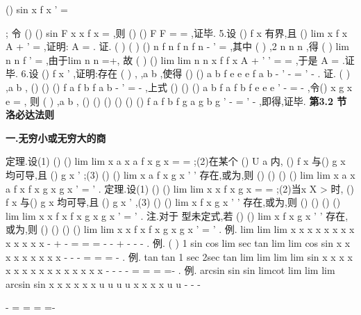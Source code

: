 ()
sin
x f x
'
\Leftrightarrow 
\cdots 
=




; 
令
()
()
sin
F x
x f x
=
\cdots 
,则
()
()
F
F \pi 
=
=
,证毕. 
5.设
()
f x 有界,且
()
lim
x
f
x
A
\to +\infty 
'
=
,证明:
A =
. 
证.
(
)
(
)
()
n
f
n
f n
f
n
\psi 
-
'
=
,其中
(
)
,2
n
n
n
\psi \in 
,得
(
)
lim
n
n
f
\psi 
\to \infty 
'
=
,由于lim
n
n
\psi 
\to \infty 
=+\infty , 
故
(
)
()
lim
lim
n
n
x
f
f
x
A
\psi 
\to \infty 
\to +\infty 
'
'
=
=
,于是
A =
.证毕. 
6.设
()
f
x
'
\neq 
,证明:存在
(
)
,
,a b
\psi \eta \in 
,使得
()
()
a
b
f
e
e e
f
a
b
\eta 
\psi 
\eta 
-
'
-
=
'
-
. 
证.
(
)
,a b
\psi 
\exists \in 
,
()
()
()
f a
f b
f
a
b
\psi 
-
'
=
-
,上式
()
()
()
a
b
f a
f b
f
e
e
e\eta 
\eta 
'
-
\Leftrightarrow 
=
-
,令()
x
g x
e
=
, 
则
(
)
,a b
\eta 
\exists 
\in 
,
()
()
()
()
()
()
f a
f b
f
g a
g b
g
\eta 
\eta 
'
-
=
'
-
,即得,证毕. 
\vspace{6pt}
{\large \bfseries \textcolor{lyred}{第3.2 节 洛必达法则}}

\vspace{4pt}
{\bfseries \textcolor{lyred}{一.无穷小或无穷大的商}}

\textcolor{lyred}{定理}.设(1)
()
()
lim
lim
x
a
x
a
f x
g x
\to 
\to 
=
=
;(2)在某个
()
U a
\circ 
内,
()
f x 与()
g x 均可导,且 
()
g
x
'
\neq 
;(3)
()
()
lim
x
a
f
x
g
x
\to 
'
'
存在,或为\infty ,则
()
()
()
()
lim
lim
x
a
x
a
f x
f
x
g x
g
x
\to 
\to 
'
=
'
. 
\textcolor{lyred}{定理}.设(1)
()
()
lim
lim
x
x
f x
g x
\to \infty 
\to \infty 
=
=
;(2)当x
X
>
时,
()
f x 与()
g x 均可导,且 
()
g
x
'
\neq 
,(3)
()
()
lim
x
f
x
g
x
\to \infty 
'
'
存在,或为\infty ,则
()
()
()
()
lim
lim
x
x
f x
f
x
g x
g
x
\to \infty 
\to \infty 
'
=
'
. 
\textcolor{lyred}{注}.对于\infty 
\infty 型未定式,若
()
()
lim
x
f
x
g
x
\to 
'
'
\Omega 
存在,或为\infty ,则
()
()
()
()
lim
lim
x
x
f x
f
x
g x
g
x
\to 
\to 
'
=
'
\Omega 
\Omega 
. 
\textcolor{lyred}{例}.
lim
lim
lim
x
x
x
x
x
x
x
x
x
x
x
x
x
\to 
\to 
\to 
-
+
-
=
=
=
-
-
+
-
-
-
. 
\textcolor{lyred}{例}.
(
)
1 sin
cos
lim sec
tan
lim
lim
cos
sin
x
x
x
x
x
x
x
x
x
\pi 
\pi 
\pi 
\to 
\to 
\to 
-
-
-
=
=
=
-
. 
\textcolor{lyred}{例}.
tan
tan
1 sec
2sec
tan
lim
lim
lim
lim
sin
x
x
x
x
x
x
x
x
x
x
x
x
x
x
x
x
\to 
\to 
\to 
\to 
-
-
-
-
=
=
=
=-
. 
\textcolor{lyred}{例}.
arcsin
sin
sin
limcot
lim
lim
lim
arcsin
sin
x
x
x
x
x
x
u
u
u
u
x
x
x
x
u
u
\to 
\to 
\to 
\to 
-
-
-


-
=
=
=
=-




